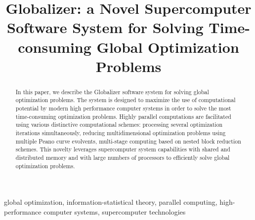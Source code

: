 \documentclass{gOMS2e}
\theoremstyle{plain}%
\theoremstyle{definition}
\theoremstyle{remark}
\begin{document}


\title{Globalizer: a Novel Supercomputer Software System for Solving Time-consuming Global Optimization Problems}

\author{
}

\maketitle

\begin{abstract}
In this paper, we describe the Globalizer software system for solving global optimization
problems. The system is designed to maximize the use of computational potential by modern
high performance computer systems in order to solve the most time-consuming optimization
problems. Highly parallel computations are facilitated using various distinctive computational
schemes: processing several optimization iterations simultaneously, reducing multidimensional
optimization problems using multiple Peano curve evolvents, multi-stage computing based on
nested block reduction schemes. This novelty leverages supercomputer system capabilities
with shared and distributed memory and with large numbers of processors to efficiently
solve global optimization problems.
\end{abstract}

\begin{keywords}
global optimization, information-statistical theory, parallel computing, high-performance
computer systems, supercomputer technologies
\end{keywords}
\end{document}
